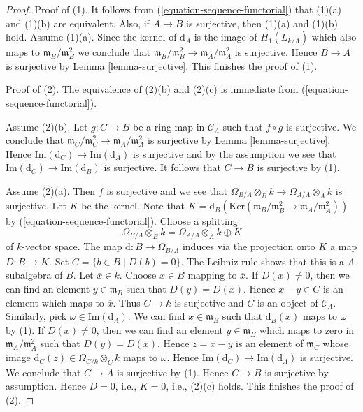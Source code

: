 \begin{proof}
Proof of (1). It follows from (\ref{equation-sequence-functorial})
that (1)(a) and (1)(b) are equivalent. Also, if
$A \to B$ is surjective, then (1)(a) and (1)(b) hold. Assume (1)(a).
Since the kernel of $\text{d}_A$ is the image of
$H_1(L_{k/\Lambda})$ which also maps to
$\mathfrak m_B/\mathfrak m_B^2$ we conclude that
$\mathfrak m_B/\mathfrak m_B^2 \to \mathfrak m_A/\mathfrak m_A^2$
is surjective. Hence $B \to A$ is surjective by
Lemma \ref{lemma-surjective}. This finishes the proof of (1).

\medskip\noindent
Proof of (2). The equivalence of (2)(b) and (2)(c) is immediate from
(\ref{equation-sequence-functorial}).

\medskip\noindent
Assume (2)(b). Let $g : C \to B$ be a ring map in $\mathcal{C}_\Lambda$
such that $f \circ g$ is surjective. We conclude that
$\mathfrak m_C/\mathfrak m_C^2 \to \mathfrak m_A/\mathfrak m_A^2$
is surjective by
Lemma \ref{lemma-surjective}.
Hence
$\text{Im}(\text{d}_C) \to \text{Im}(\text{d}_A)$ is surjective
and by the assumption we see that
$\text{Im}(\text{d}_C) \to \text{Im}(\text{d}_B)$ is surjective.
It follows that $C \to B$ is surjective by (1).

\medskip\noindent
Assume (2)(a). Then $f$ is surjective and we see that
$\Omega_{B/\Lambda} \otimes_B k \to \Omega_{A/\Lambda} \otimes_A k$
is surjective. Let $K$ be the kernel. Note that
$K = \text{d}_B(\text{Ker}(\mathfrak m_B/\mathfrak m_B^2 \to
\mathfrak m_A/\mathfrak m_A^2))$ by (\ref{equation-sequence-functorial}).
Choose a splitting
$$
\Omega_{B/\Lambda} \otimes_B k =
\Omega_{A/\Lambda} \otimes_A k \oplus K
$$
of $k$-vector space. The map $\text{d} : B \to \Omega_{B/\Lambda}$
induces via the projection onto $K$ a map $D : B \to K$. Set
$C = \{b \in B \mid D(b) = 0\}$. The Leibniz rule shows that this is
a $\Lambda$-subalgebra of $B$. Let $\overline{x} \in k$. Choose $x \in B$
mapping to $\overline{x}$. If $D(x) \not = 0$, then we can find an element
$y \in \mathfrak m_B$ such that $D(y) = D(x)$. Hence $x - y \in C$ is
an element which maps to $\overline{x}$. Thus $C \to k$ is surjective
and $C$ is an object of $\mathcal{C}_\Lambda$. Similarly, pick
$\omega \in \text{Im}(\text{d}_A)$. We can find $x \in \mathfrak m_B$
such that $\text{d}_B(x)$ maps to $\omega$ by (1). If $D(x) \not = 0$, then
we can find an element $y \in \mathfrak m_B$ which maps to zero
in $\mathfrak m_A/\mathfrak m_A^2$ such that $D(y) = D(x)$.
Hence $z = x - y$ is an element of $\mathfrak m_C$ whose
image $\text{d}_C(z) \in \Omega_{C/k} \otimes_C k$ maps to $\omega$.
Hence $\text{Im}(\text{d}_C) \to \text{Im}(\text{d}_A)$ is surjective.
We conclude that $C \to A$ is surjective by (1). Hence $C \to B$ is
surjective by assumption. Hence $D = 0$, i.e., $K = 0$, i.e., (2)(c) holds.
This finishes the proof of (2).


\end{proof}
